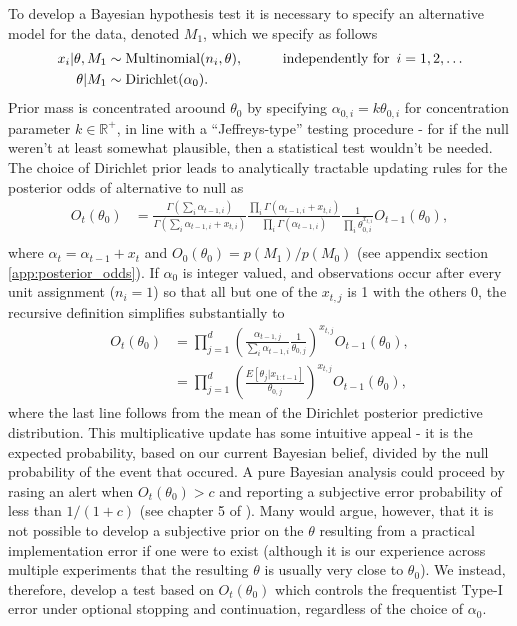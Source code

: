 \documentclass[11pt]{article}
\begin{document}
To develop a Bayesian hypothesis test it is necessary to specify an alternative model for the data, denoted $M_1$, which we specify as follows
\begin{align}
    x_i | \theta, M_1 &\sim \text{Multinomial}(n_i,\theta), \hspace{1cm} \text{independently for }\, i=1,2,\dots\\
  \theta | M_1 &\sim \text{Dirichlet}(\alpha_0).\notag
\end{align}
Prior mass is concentrated aroound $\theta_0$ by specifying $\alpha_{0,i} = k \theta_{0,i}$ for concentration parameter $k \in \mathbb{R}^+$, in line with a ``Jeffreys-type'' testing procedure - for if the null weren't at least somewhat plausible, then a statistical test wouldn't be needed. The choice of Dirichlet prior leads to analytically tractable updating rules for the posterior odds of alternative to null as 
\begin{align}
  \label{eq:update_rule}
  O_{t}(\theta_0) &= \frac{\Gamma(\sum_i \alpha_{t-1,i})}{\Gamma(\sum_i \alpha_{t-1,i} +  x_{t,i})} \frac{\prod_i \Gamma(\alpha_{t-1,i} + x_{t,i})}{\prod_i \Gamma(\alpha_{t-1,i})} \frac{1}{\prod_i \theta_{0,i}^{x_{t,i}}}  O_{t-1}(\theta_0),\\
\end{align}
where $\alpha_t = \alpha_{t-1}+x_t$ and $O_0(\theta_0)=p(M_1)/p(M_0)$ (see appendix section \ref{app:posterior_odds}). If $\alpha_0$ is integer valued, and observations occur after every unit assignment ($n_i=1$) so that all but one of the $x_{t,j}$ is 1 with the others 0, the recursive definition simplifies substantially to
\begin{align}
  \label{eq:simplified_bayes_factor}
  O_{t}(\theta_0) &= \prod_{j=1}^{d} \left(\frac{\alpha_{t-1,j}}{\sum_i \alpha_{t-1,i}} \frac{1}{\theta_{0,j}}\right)^{x_{t,j}} O_{t-1}(\theta_0),\\
  &=\prod_{j=1}^{d}\left(\frac{E[\theta_j|x_{1:t-1}]}{\theta_{0,j}} \right)^{x_{t,j}} O_{t-1}(\theta_0),
\end{align}
where the last line follows from the mean of the Dirichlet posterior predictive distribution. This multiplicative update has some intuitive appeal - it is the expected probability, based on our current Bayesian belief, divided by the null probability of the event that occured.
A pure Bayesian analysis could proceed by rasing an alert when $O_t(\theta_0) > c$ and reporting a subjective error probability of less than $1/(1+c)$ (see chapter 5 of \cite{bernardo}).
Many would argue, however, that it is not possible to develop a subjective prior on the $\theta$ resulting from a practical implementation error if one were to exist (although it is our experience across multiple experiments that the resulting $\theta$ is usually very close to $\theta_0$).
We instead, therefore, develop a test based on $O_t(\theta_0)$ which controls the frequentist Type-I error under optional stopping and continuation, regardless of the choice of $\alpha_0$.
\end{document}
